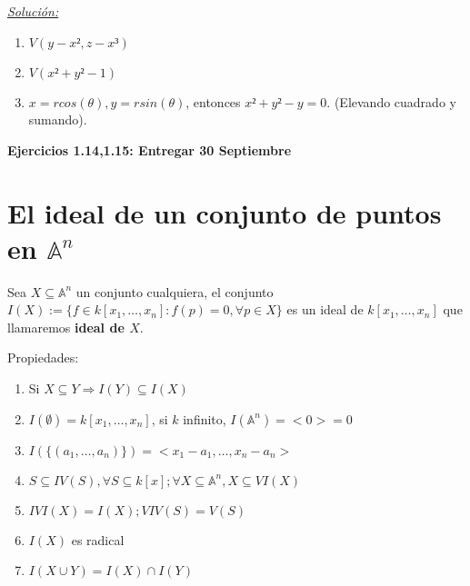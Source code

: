 \underline{\textit{Solución: }}

\begin{enumerate}
\item $V(y-x²,z-x³)$
\item $V(x²+y²-1)$
\item $x=rcos(\theta),y=rsin(\theta)$, entonces $x²+y²-y=0$. (Elevando cuadrado y sumando).
\end{enumerate}

\textbf{Ejercicios 1.14,1.15: Entregar 30 Septiembre}

\section{El ideal de un conjunto de puntos en $\mathbb{A}^n$}


\begin{Def}
Sea $X\subseteq \mathbb{A}^n$ un conjunto cualquiera, el conjunto $I(X):= \{ f \in k[x_1,\dots ,x_n] : f(p)=0, \forall p \in X \}$ es un ideal de $k[x_1, \dots,x_n]$ que llamaremos \textbf{ideal de $X$}.
\end{Def}
Propiedades:

\begin{enumerate}
\item Si $X\subseteq Y \Rightarrow I(Y)\subseteq I(X)$
\item $I(\emptyset )=k[x_1,\dots ,x_n]$, si $k$ infinito, $I(\mathbb{A}^n)=<0>=0$
\item $I(\{ (a_1, \dots , a_n) \}) = <x_1-a_1,\dots ,x_n-a_n>$
\item $S\subseteq IV(S), \forall S\subseteq k[x] ; \forall X\subseteq \mathbb{A}^n, X\subseteq VI(X)$
\item $IVI(X)=I(X); VIV(S)=V(S)$
\item $I(X)$ es radical
\item $I(X\cup Y)=I(X)\cap I(Y)$
\end{enumerate}

